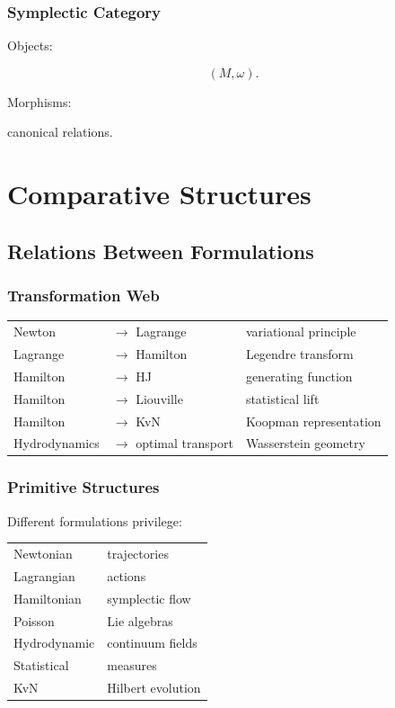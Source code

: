 \documentclass[11pt]{book}
\begin{document}
\section{Symplectic Category}

Objects:

\[
(M,\omega).
\]

Morphisms:

canonical relations.

\part{Comparative Structures}

\chapter{Relations Between Formulations}

\section{Transformation Web}

\begin{center}
\begin{tabular}{lll}
Newton & $\to$ Lagrange & variational principle \\
Lagrange & $\to$ Hamilton & Legendre transform \\
Hamilton & $\to$ HJ & generating function \\
Hamilton & $\to$ Liouville & statistical lift \\
Hamilton & $\to$ KvN & Koopman representation \\
Hydrodynamics & $\to$ optimal transport & Wasserstein geometry
\end{tabular}
\end{center}

\section{Primitive Structures}

Different formulations privilege:

\begin{center}
\begin{tabular}{ll}
Newtonian & trajectories \\
Lagrangian & actions \\
Hamiltonian & symplectic flow \\
Poisson & Lie algebras \\
Hydrodynamic & continuum fields \\
Statistical & measures \\
KvN & Hilbert evolution
\end{tabular}
\end{center}
\end{document}
